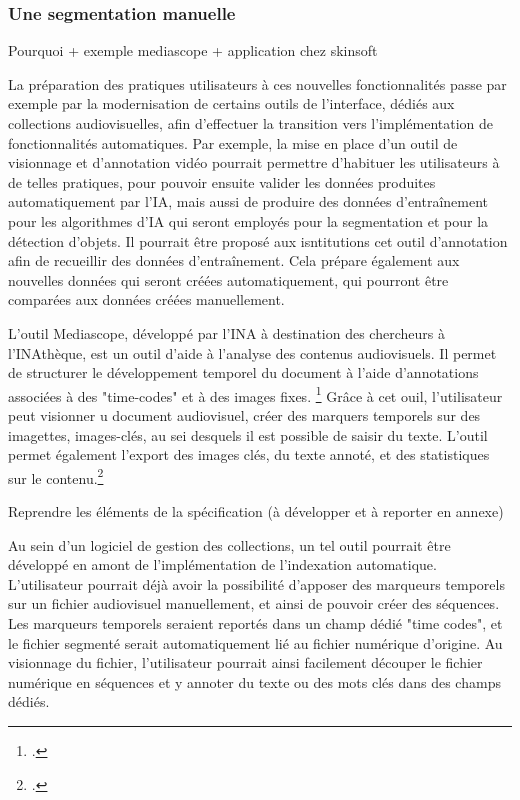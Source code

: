 \subsubsection{Une segmentation manuelle} 

Pourquoi + exemple mediascope + application chez skinsoft

La préparation des pratiques utilisateurs à ces nouvelles fonctionnalités passe par exemple par la modernisation de certains outils de l'interface, dédiés aux collections audiovisuelles, afin d'effectuer la transition vers l'implémentation de fonctionnalités automatiques. Par exemple, la mise en place d'un outil de visionnage et d'annotation vidéo pourrait permettre d'habituer les utilisateurs à de telles pratiques, pour pouvoir ensuite valider les données produites automatiquement par l'IA, mais aussi de produire des données d'entraînement pour les algorithmes d'IA qui seront employés pour la segmentation et pour la détection d'objets. Il pourrait être proposé aux isntitutions cet outil d'annotation afin de recueillir des données d'entraînement. 
Cela prépare également aux nouvelles données qui seront créées automatiquement, qui pourront être comparées aux données créées manuellement. 

L'outil Mediascope, développé par l'INA à destination des chercheurs à l'INAthèque, est un outil d'aide à l'analyse des contenus audiovisuels.  Il permet de structurer le développement temporel du document à l'aide d'annotations associées à des "time-codes" et à des images fixes. \footcite{zotero-item-746} Grâce à cet ouil, l'utilisateur peut visionner u document audiovisuel, créer des marquers temporels sur des imagettes, images-clés, au sei desquels il est possible de saisir du texte. L'outil permet également l'export des images clés, du texte annoté, et des statistiques sur le contenu.\footcite{zotero-item-746}

Reprendre les éléments de la spécification (à développer et à reporter en annexe)

Au sein d'un logiciel de gestion des collections, un tel outil pourrait être développé en amont de l'implémentation de l'indexation automatique. L'utilisateur pourrait déjà avoir la possibilité d'apposer des marqueurs temporels sur un fichier audiovisuel manuellement, et ainsi de pouvoir créer des séquences. Les marqueurs temporels seraient reportés dans un champ dédié "time codes", et le fichier segmenté serait automatiquement lié au fichier numérique d'origine. Au visionnage du fichier, l'utilisateur pourrait ainsi facilement découper le fichier numérique en séquences et y annoter du texte ou des mots clés dans des champs dédiés. 

